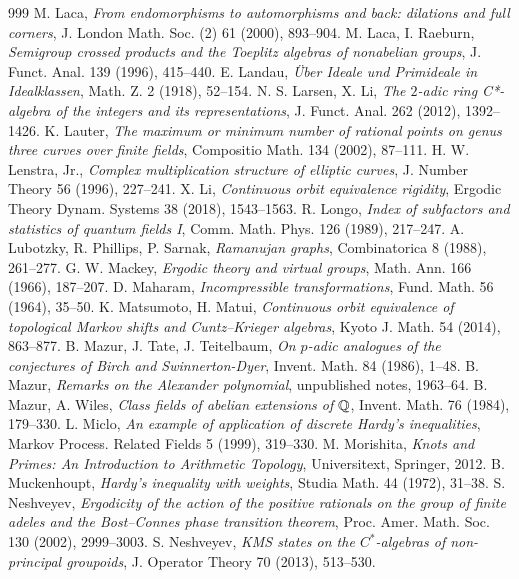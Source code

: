 \begin{thebibliography}{999}
 M. Laca, \emph{From endomorphisms to automorphisms and back: dilations and full corners}, J. London Math. Soc. (2) 61 (2000), 893--904.
 M. Laca, I. Raeburn, \emph{Semigroup crossed products and the Toeplitz algebras of nonabelian groups}, J. Funct. Anal. 139 (1996), 415--440.
 E. Landau, \emph{\"Uber Ideale und Primideale in Idealklassen}, Math. Z. 2 (1918), 52--154.
 N. S. Larsen, X. Li, \emph{The $2$-adic ring C*-algebra of the integers and its representations}, J. Funct. Anal. 262 (2012), 1392--1426.
 K. Lauter, \emph{The maximum or minimum number of rational points on genus three curves over finite fields}, Compositio Math. 134 (2002), 87--111.
 H. W. Lenstra, Jr., \emph{Complex multiplication structure of elliptic curves}, J. Number Theory 56 (1996), 227--241.
 X. Li, \emph{Continuous orbit equivalence rigidity}, Ergodic Theory Dynam. Systems 38 (2018), 1543--1563.
 R. Longo, \emph{Index of subfactors and statistics of quantum fields I}, Comm. Math. Phys. 126 (1989), 217--247.
 A. Lubotzky, R. Phillips, P. Sarnak, \emph{Ramanujan graphs}, Combinatorica 8 (1988), 261--277.
 G. W. Mackey, \emph{Ergodic theory and virtual groups}, Math. Ann. 166 (1966), 187--207.
 D. Maharam, \emph{Incompressible transformations}, Fund. Math. 56 (1964), 35--50.
 K. Matsumoto, H. Matui, \emph{Continuous orbit equivalence of topological Markov shifts and Cuntz--Krieger algebras}, Kyoto J. Math. 54 (2014), 863--877.
 B. Mazur, J. Tate, J. Teitelbaum, \emph{On $p$-adic analogues of the conjectures of Birch and Swinnerton-Dyer}, Invent. Math. 84 (1986), 1--48.
 B. Mazur, \emph{Remarks on the Alexander polynomial}, unpublished notes, 1963--64.
 B. Mazur, A. Wiles, \emph{Class fields of abelian extensions of $\mathbb{Q}$}, Invent. Math. 76 (1984), 179--330.
 L. Miclo, \emph{An example of application of discrete Hardy's inequalities}, Markov Process. Related Fields 5 (1999), 319--330.
 M. Morishita, \emph{Knots and Primes: An Introduction to Arithmetic Topology}, Universitext, Springer, 2012.
 B. Muckenhoupt, \emph{Hardy's inequality with weights}, Studia Math. 44 (1972), 31--38.
 S. Neshveyev, \emph{Ergodicity of the action of the positive rationals on the group of finite adeles and the Bost--Connes phase transition theorem}, Proc. Amer. Math. Soc. 130 (2002), 2999--3003.
 S. Neshveyev, \emph{KMS states on the $C^*$-algebras of non-principal groupoids}, J. Operator Theory 70 (2013), 513--530.

\end{thebibliography}
